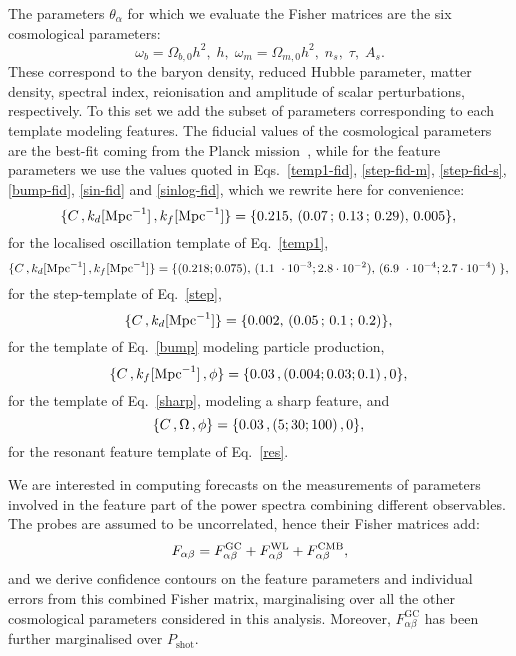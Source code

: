 \documentclass[12pt]{article}
\newcommand{\nn}{{\nonumber}}
\newcommand{\be}{\begin{equation}}
\newcommand{\ee}{\end{equation}}
\begin{document}
The parameters $\theta_\alpha$ for which we evaluate the Fisher matrices are the six cosmological parameters:
\be
\omega_b = \Omega_{b,0}h^2, \; h, \; \omega_m = \Omega_{m,0}h^2, \; n_s, \; \tau, \; A_s.
\ee
These correspond to the baryon density, reduced Hubble parameter, matter density, spectral index, reionisation and amplitude of scalar perturbations, respectively. To this set we add the subset of parameters  corresponding to each template modeling features. The fiducial values of the cosmological parameters are the best-fit coming from the Planck mission~\cite{planck}, while for the feature parameters we use the values quoted in Eqs.~\eqref{temp1-fid}, \eqref{step-fid-m}, \eqref{step-fid-s}, \eqref{bump-fid}, \eqref{sin-fid} and \eqref{sinlog-fid}, which we rewrite here for convenience:
%
\be
\{C\,, k_d[\text{Mpc}^{-1}]\,,k_f[\text{Mpc}^{-1}]  \} = \{0.215,\,(0.07\,;\,0.13\,;\, 0.29),\, 0.005 \},\nn
\ee 
%
for the localised oscillation template of Eq.~\eqref{temp1},
%
\be
\{C\,, k_d[\text{Mpc}^{-1}]\,,k_f[\text{Mpc}^{-1}]  \} = \{(0.218;0.075),\, (1.1\ \cdot10^{-3};2.8\cdot 10^{-2}),\, (6.9\ \cdot10^{-4};2.7\cdot 10^{-4})\; \},\nn
\ee 
%
for the step-template of Eq.~\eqref{step}, 
%
\be
\{C\,, k_d[\text{Mpc}^{-1}] \} = \{0.002,\, (0.05\,;\, 0.1\,;\, 0.2) \}, \nn
\ee
%
for the template of Eq.~\eqref{bump} modeling particle production,
%
\be
\{C\,,k_f[\text{Mpc}^{-1}]\,, \phi \} = \{ 0.03\,,(0.004;0.03;0.1)\,, 0\}, \nn
\ee
%
for the template of Eq.~\eqref{sharp}, modeling a sharp feature, and
%
\be
\{C\,,\Omega\,, \phi \} = \{ 0.03\,,(5;30;100)\,, 0\}, \nn
\ee
%
for the resonant feature template of Eq.~\eqref{res}.


We are interested in computing forecasts on the measurements of parameters involved in the feature part of the power spectra combining different 
observables. The probes are assumed to be uncorrelated, hence their Fisher matrices add:
\begin{equation}
F_{\alpha\beta} = F_{\alpha\beta}^\mathrm{GC} + F_{\alpha\beta}^{\rm WL} + F^{\rm CMB}_{\alpha\beta},
\end{equation}
and we derive confidence contours on the feature parameters and individual errors from this combined Fisher matrix, marginalising over all the other cosmological parameters considered in this analysis. Moreover, $F^\mathrm{GC}_{\alpha\beta}$ has been further marginalised over $P_\mathrm{shot}$.
\end{document}
